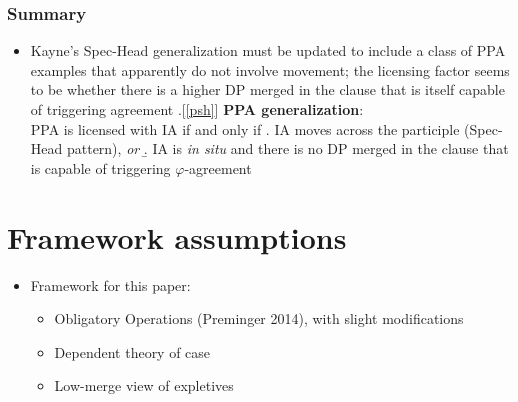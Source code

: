 \documentclass[letterpaper,10pt]{handout_nick}
\begin{document}
\begin{itemize}
\begin{comment}
\subsubsection{Icelandic}
\begin{itemize}
\item {\bf Basic Data}: \emph{in situ} objects of passive and unaccusative clauses are associated with a CP expletive; PPA is obligatory for \emph{in situ} and promoted objects
\ex. \ag. Einhver nemandi hefur tekinn \'i b\'okasafninu.\\
some student.\SC{nom.m.sg} has been taken.\SC{nom.m.sg} in library-the\\
`Some student has been taken in the library.'
\bg. {\textthorn a\dh} hefur {veri\dh} tekinn einhver nemandi \'i b\'okasafninu.\\
\SC{expl} has been taken.\SC{nom.m.sg} some student.\SC{nom.m.sg} in library-the\\
`There has been some student taken in the library.'\\
(Thrainsson 2007: 272)

\end{itemize}
\end{comment}
\end{itemize}
\subsubsection{Summary}
\begin{itemize}
\item Kayne's Spec-Head generalization must be updated to include a class of PPA examples that apparently do not involve movement; the licensing factor seems to be whether there is a higher DP merged in the clause that is itself capable of triggering agreement
\ex.[\ref{psh}] {\bf PPA generalization}:\\
PPA is licensed with IA if and only if
\a. IA moves across the participle (Spec-Head pattern), \emph{or}
\b. IA is \emph{in situ} and there is no DP merged in the clause that is capable of triggering $\varphi$-agreement 

\end{itemize}
\section{Framework assumptions}
\begin{itemize}
\item Framework for this paper: 
\begin{itemize}
\item Obligatory Operations (Preminger 2014), with slight modifications
\item Dependent theory of case
\item Low-merge view of expletives
\end{itemize}
\end{itemize}
\end{document}
